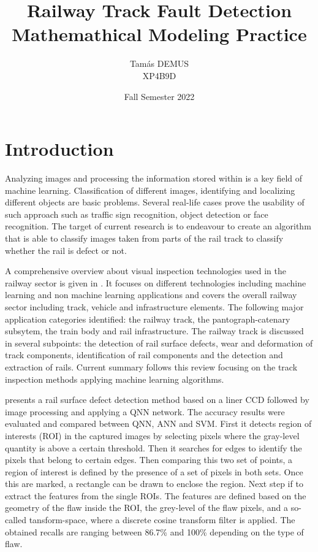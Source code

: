\documentclass[10pt, final]{article}
\title{Railway Track Fault Detection\\\large Mathemathical Modeling Practice\\}
\author{Tamás DEMUS\\XP4B9D}
\date{Fall Semester 2022}
\begin{document}
	\maketitle
	\tableofcontents
	\section{Introduction}
		Analyzing images and processing the information stored within 
		is a key field of machine learning.
		Classification of different images, identifying and localizing 
		different objects are basic problems.
		Several real-life cases prove the usability of such approach 
		such as traffic sign recognition, object detection or face recognition.
		The target of current research is to endeavour to create an algorithm
		that is able to classify images taken from parts of the rail track
		to classify whether the rail is defect or not.

		A comprehensive overview about visual inspection technologies used in the railway sector is given
		in \cite{liu_review_2019}.
		It focuses on different technologies including machine learning and non machine learning applications
		and covers the overall railway sector including track, vehicle and infrastructure elements.
		The following major application categories identified: the railway track, the pantograph-catenary
		subsytem, the train body and rail infrastructure.
		The railway track is discussed in several subpoints: the detection of rail surface defects, wear and
		deformation of track components, identification of rail components and the detection and extraction  of rails.
		Current summary follows this review focusing on the track inspection methods applying machine learning
		algorithms.

		\citeauthor{xue_wang_machine-vision_2008} presents a rail surface defect detection method \cite{xue_wang_machine-vision_2008}
		based on a liner CCD followed by image processing and applying a QNN network.
		The accuracy results were evaluated and compared between QNN, ANN and SVM.
		First it detects region of interests (ROI) in the captured images by selecting pixels where the gray-level
		quantity is above a certain threshold.
		Then it searches for edges to identify the pixels that belong to certain edges.
		Then comparing this two set of points, a region of interest is defined by the presence of a set of pixels
		in both sets.
		Once this are marked, a rectangle can be drawn to enclose the region.
		Next step if to extract the features from the single ROIs.
		The features are defined based on the geometry of the flaw inside the ROI, the grey-level of the flaw pixels,
		and a so-called tansform-space, where a discrete cosine transform filter is applied.
		The obtained recalls are ranging between 86.7\% and 100\% depending on the type of flaw.
\end{document}
